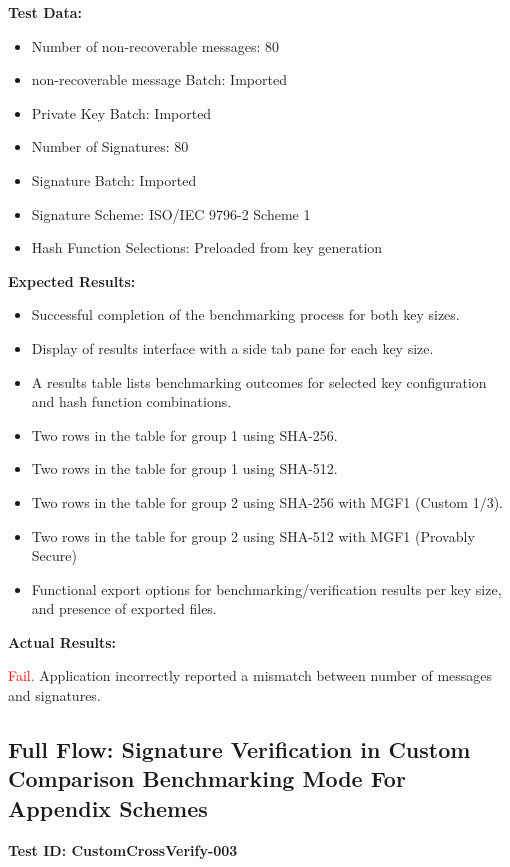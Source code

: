 \documentclass[]{final_report}
\theoremstyle{definition}
\begin{document}
\textbf{Test Data:}
\begin{itemize}
    \item Number of non-recoverable messages: 80
    \item non-recoverable message Batch: Imported
    \item Private Key Batch: Imported
     \item Number of Signatures: 80
     \item Signature Batch: Imported
    \item Signature Scheme: ISO/IEC 9796-2 Scheme 1
     \item Hash Function Selections: Preloaded from key generation
\end{itemize}

\textbf{Expected Results:}
\begin{itemize}
    \item Successful completion of the benchmarking process for both key sizes.
    \item Display of results interface with a side tab pane for each key size.
    \item A results table lists benchmarking outcomes for selected key configuration and hash function combinations.
    \item Two rows in the table for group 1 using SHA-256.
    \item Two rows in the table for group 1 using SHA-512.
    \item Two rows in the table for group 2 using SHA-256 with MGF1 (Custom 1/3).
    \item Two rows in the table for group 2 using SHA-512 with MGF1 (Provably Secure)
    \item Functional export options for benchmarking/verification results per key size, and presence of exported files.
\end{itemize}

\textbf{Actual Results:}

\textcolor{red}{Fail.} Application incorrectly reported a mismatch between number of messages and signatures.

\subsection*{Full Flow: Signature Verification in Custom Comparison Benchmarking Mode For Appendix Schemes}


\textbf{Test ID: CustomCrossVerify-003}
\end{document}
